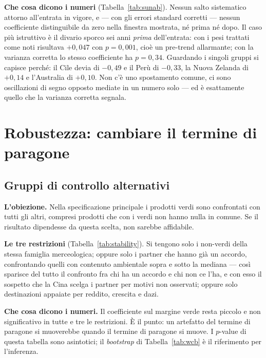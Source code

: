 \documentclass[11pt,a4paper]{article}
\begin{document}
\textbf{Che cosa dicono i numeri} (Tabella~\ref{tab:sunab}). Nessun salto sistematico
attorno all'entrata in vigore, e --- con gli errori standard corretti --- nessun
coefficiente distinguibile da zero nella finestra mostrata, n\'e prima n\'e dopo. Il caso
pi\`u istruttivo \`e il divario sporco sei anni \emph{prima} dell'entrata: con i pesi
trattati come noti risultava $+0{,}047$ con $p=0{,}001$, cio\`e un pre-trend allarmante;
con la varianza corretta lo stesso coefficiente ha $p=0{,}34$. Guardando i singoli gruppi
si capisce perch\'e: il Cile devia di $-0{,}49$ e il Per\`u di $-0{,}33$, la Nuova Zelanda
di $+0{,}14$ e l'Australia di $+0{,}10$. Non c'\`e uno spostamento comune, ci sono
oscillazioni di segno opposto mediate in un numero solo --- ed \`e esattamente quello che
la varianza corretta segnala.



\clearpage
\section{Robustezza: cambiare il termine di paragone}

\subsection{Gruppi di controllo alternativi}

\textbf{L'obiezione.} Nella specificazione principale i prodotti verdi sono confrontati con
tutti gli altri, compresi prodotti che con i verdi non hanno nulla in comune. Se il
risultato dipendesse da questa scelta, non sarebbe affidabile.

\textbf{Le tre restrizioni} (Tabella~\ref{tab:stability}). Si tengono solo i non-verdi della
stessa famiglia merceologica; oppure solo i partner che hanno gi\`a un accordo, confrontando
quelli con contenuto ambientale sopra e sotto la mediana --- cos\`i sparisce del tutto il
confronto fra chi ha un accordo e chi non ce l'ha, e con esso il sospetto che la Cina scelga
i partner per motivi non osservati; oppure solo destinazioni appaiate per reddito, crescita
e dazi.

\textbf{Che cosa dicono i numeri.} Il coefficiente sul margine verde resta piccolo e non
significativo in tutte e tre le restrizioni. \`E il punto: un artefatto del termine di
paragone si muoverebbe quando il termine di paragone si muove. I $p$-value di questa tabella
sono asintotici; il \emph{bootstrap} di Tabella~\ref{tab:wcb} \`e il riferimento per l'inferenza.
\end{document}
